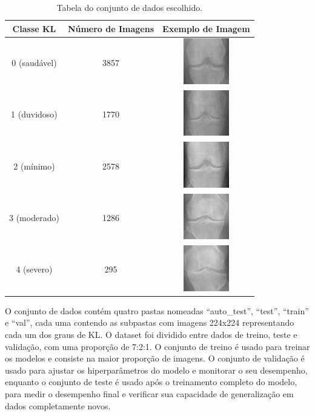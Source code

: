 \begin{table}[htbp]
    \centering
    \begin{tabular}{|c|c|c|}
        \hline
        \textbf{Classe KL} & \textbf{Número de Imagens} & \textbf{Exemplo de Imagem} \\
        \hline
        0 (saudável) & 3857 & \includegraphics[width=2cm]{figs/KL0-sample.png} \\
        \hline
        1 (duvidoso) & 1770 & \includegraphics[width=2cm]{figs/KL1-sample.png} \\
        \hline
        2 (mínimo) & 2578 & \includegraphics[width=2cm]{figs/KL2-sample.png} \\
        \hline
        3 (moderado) & 1286 & \includegraphics[width=2cm]{figs/KL3-sample.png} \\
        \hline
        4 (severo) & 295 & \includegraphics[width=2cm]{figs/KL4-sample.png} \\
        \hline
    \end{tabular}
    \caption{Tabela do conjunto de dados escolhido.}
    \label{tabela-dataset}
\end{table}

O conjunto de dados contém quatro pastas nomeadas ``auto\_test'', ``test'', ``train'' e ``val'', cada uma contendo as subpastas com imagens 224x224 representando cada um dos graus de KL. O dataset foi dividido entre dados de treino, teste e validação, com uma proporção de 7:2:1. O conjunto de treino é usado para treinar os modelos e consiste na maior proporção de imagens. O conjunto de validação é usado para ajustar os hiperparâmetros do modelo e monitorar o seu desempenho, enquanto o conjunto de teste é usado após o treinamento completo do modelo, para medir o desempenho final e verificar sua capacidade de generalização em dados completamente novos.


